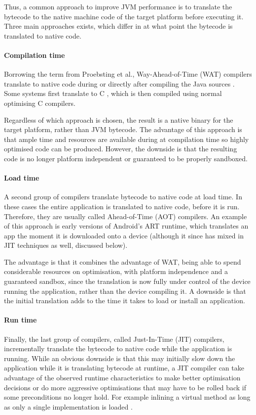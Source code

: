 Thus, a common approach to improve JVM performance is to translate the bytecode to the native machine code of the target platform before executing it. Three main approaches exists, which differ in at what point the bytecode is translated to native code.

\paragraph{Compilation time}
Borrowing the term from Proebsting et al., Way-Ahead-of-Time (WAT) compilers translate to native code during or directly after compiling the Java sources \cite{Proebsting:1997wg}. Some systems first translate to C \cite{Dean:1996wb}, which is then compiled using normal optimising C compilers. 

Regardless of which approach is chosen, the result is a native binary for the target platform, rather than JVM bytecode. The advantage of this approach is that ample time and resources are available during at compilation time so highly optimised code can be produced. However, the downside is that the resulting code is no longer platform independent or guaranteed to be properly sandboxed.

\paragraph{Load time}
A second group of compilers translate bytecode to native code at load time. In these cases the entire application is translated to native code, before it is run. Therefore, they are usually called Ahead-of-Time (AOT) compilers. An example of this approach is early versions of Android's ART runtime, which translates an app the moment it is downloaded onto a device (although it since has mixed in JIT techniques as well, discussed below).

The advantage is that it combines the advantage of WAT, being able to spend considerable resources on optimisation, with platform independence and a guaranteed sandbox, since the translation is now fully under control of the device running the application, rather than the device compiling it. A downside is that the initial translation adds to the time it takes to load or install an application.

\paragraph{Run time}
Finally, the last group of compilers, called Just-In-Time (JIT) compilers, incrementally translate the bytecode to native code while the application is running. While an obvious downside is that this may initially slow down the application while it is translating bytecode at runtime, a JIT compiler can take advantage of the observed runtime characteristics to make better optimisation decisions or do more aggressive optimisations that may have to be rolled back if some preconditions no longer hold. For example inlining a virtual method as long as only a single implementation is loaded \cite{Ishizaki:2000vv}.







